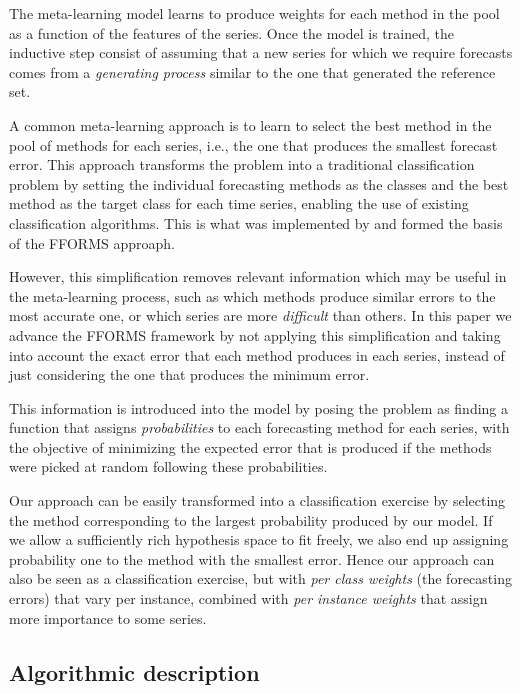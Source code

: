 \documentclass[11pt,a4paper,]{article}
\theoremstyle{definition}
\theoremstyle{definition}
\theoremstyle{definition}
\theoremstyle{remark}
\begin{document}
The meta-learning model learns to produce weights for each method in the
pool as a function of the features of the series. Once the model is
trained, the inductive step consist of assuming that a new series for
which we require forecasts comes from a \emph{generating process}
similar to the one that generated the reference set.

A common meta-learning approach is to learn to select the best method in
the pool of methods for each series, i.e., the one that produces the
smallest forecast error. This approach transforms the problem into a
traditional classification problem by setting the individual forecasting
methods as the classes and the best method as the target class for each
time series, enabling the use of existing classification algorithms.
This is what was implemented by \textcite{fforms} and formed the basis
of the FFORMS approaph.

However, this simplification removes relevant information which may be
useful in the meta-learning process, such as which methods produce
similar errors to the most accurate one, or which series are more
\emph{difficult} than
others.
In this paper we advance the FFORMS framework by not applying this
simplification and taking into account the exact error that each method
produces in each series, instead of just considering the one that
produces the minimum error.

This information is introduced into the model by posing the problem as
finding a function that assigns \emph{probabilities} to each forecasting
method for each series, with the objective of minimizing the expected
error that is produced if the methods were picked at random following
these probabilities.

Our approach can be easily transformed into a classification exercise by
selecting the method corresponding to the largest probability produced
by our model. If we allow a sufficiently rich hypothesis space to fit
freely, we also end up assigning probability one to the method with the
smallest error. Hence our approach can also be seen as a classification
exercise, but with \emph{per class weights} (the forecasting errors)
that vary per instance, combined with \emph{per instance weights} that
assign more importance to some
series.

\subsection{Algorithmic description}\label{algorithmic-description}
\end{document}
